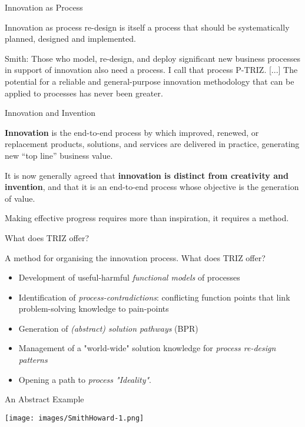 \documentclass{beamer}
\begin{document}
\begin{frame}{Innovation as Process}

Innovation as process re-design is itself a process that should be
systematically planned, designed and implemented.

Smith: Those who model, re-design, and deploy significant new business
processes in support of innovation also need a process. I call that process
P-TRIZ.  [...]  The potential for a reliable and general-purpose innovation
methodology that can be applied to processes has never been greater.
\end{frame}

\begin{frame}{Innovation and Invention}

\textbf{Innovation} is the end-to-end process by which improved, renewed, or
replacement products, solutions, and services are delivered in practice,
generating new “top line” business value.

It is now generally agreed that \textbf{innovation is distinct from creativity
  and invention}, and that it is an end-to-end process whose objective is the
generation of value.

Making effective progress requires more than inspiration, it requires a
method. 
\end{frame}

\begin{frame}{What does TRIZ offer?}

A method for organising the innovation process. What does TRIZ offer?
\begin{itemize}
\item Development of useful-harmful \emph{functional models} of processes
\item Identification of \emph{process-contradictions}: conflicting function
  points that link problem-solving knowledge to pain-points
\item Generation of \emph{(abstract) solution pathways} (BPR) 
\item Management of a "world-wide" solution knowledge for \emph{process
  re-design patterns}
\item Opening a path to \emph{process "Ideality"}.
\end{itemize}
\end{frame}

\begin{frame}{An Abstract Example}
\begin{center}
  \texttt{[image: images/SmithHoward-1.png]}
\end{center}
\end{frame}
\end{document}
